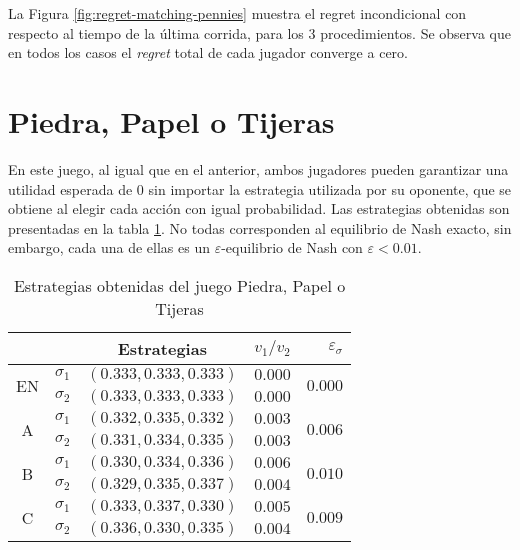 La Figura \ref{fig:regret-matching-pennies} muestra el regret incondicional con respecto al tiempo de la última corrida, para los $3$ procedimientos. Se observa que en todos los casos el \textit{regret} total de cada jugador converge a cero.



\section{Piedra, Papel o Tijeras}

En este juego, al igual que en el anterior, ambos jugadores pueden garantizar una utilidad esperada de $0$ sin importar la estrategia utilizada por su oponente, que se obtiene al elegir cada acción con igual probabilidad. Las estrategias obtenidas son presentadas en la tabla \ref{tab:estrategias-RPS}. No todas corresponden al equilibrio de Nash exacto, sin embargo, cada una de ellas es un $\varepsilon$-equilibrio de Nash con $\varepsilon < 0.01$.

\begin{table}
    \centering
    \begin{tabular}{c c|c|r|r}
        & & Estrategias & $v_1 / v_2$ & $\varepsilon_{\sigma}$ \\
        \hline
        \multirow{2}{*}{EN}
        & $\sigma_1$ & $(0.333, 0.333, 0.333)$ & $0.000$ & \multirow{2}{*}{$0.000$}\\
        & $\sigma_2$ & $(0.333, 0.333, 0.333)$ &  $0.000$ & \\
        \hline
        \multirow{2}{*}{A}
        & $\sigma_1$ & $(0.332, 0.335, 0.332)$ & $0.003$ & \multirow{2}{*}{$0.006$}\\
        & $\sigma_2$ & $(0.331, 0.334, 0.335)$ & $0.003$ & \\
        \hline
        \multirow{2}{*}{B}
        & $\sigma_1$ & $(0.330, 0.334, 0.336)$ & $0.006$ & \multirow{2}{*}{$0.010$}\\
        & $\sigma_2$ & $(0.329, 0.335, 0.337)$ & $0.004$ & \\
        \hline
        \multirow{2}{*}{C}
        & $\sigma_1$ & $(0.333, 0.337, 0.330)$ & $0.005$ & \multirow{2}{*}{$0.009$} \\
        & $\sigma_2$ &$(0.336, 0.330, 0.335)$  & $0.004$ & \\
        \hline
    \end{tabular}
    \caption{Estrategias obtenidas del juego Piedra, Papel o Tijeras}
    \label{tab:estrategias-RPS}
\end{table}


